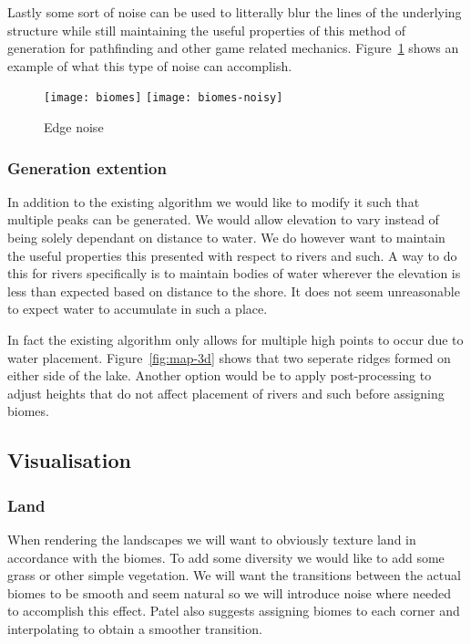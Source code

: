 Lastly some sort of noise can be used to litterally blur the lines of the underlying structure while still maintaining the useful properties of this method of generation for pathfinding and other game related mechanics. Figure~\ref{fig:biomes} shows an example of what this type of noise can accomplish.

\newlength{\imagewidth}

\begin{figure}[H]
	\centering
	\texttt{[image: biomes]}
	\texttt{[image: biomes-noisy]}
	\caption{Edge noise}
	\label{fig:biomes}
\end{figure}

\subsubsection{Generation extention}

In addition to the existing algorithm we would like to modify it such that multiple peaks can be generated. We would allow elevation to vary instead of being solely dependant on distance to water. We do however want to maintain the useful properties this presented with respect to rivers and such. A way to do this for rivers specifically is to maintain bodies of water wherever the elevation is less than expected based on distance to the shore. It does not seem unreasonable to expect water to accumulate in such a place. 

In fact the existing algorithm only allows for multiple high points to occur due to water placement. Figure~\ref{fig:map-3d} shows that two seperate ridges formed on either side of the lake. Another option would be to apply post-processing to adjust heights that do not affect placement of rivers and such before assigning biomes.

\subsection{Visualisation}

\subsubsection{Land}

When rendering the landscapes we will want to obviously texture land in accordance with the biomes. To add some diversity we would like to add some grass or other simple vegetation. We will want the transitions between the actual biomes to be smooth and seem natural so we will introduce noise where needed to accomplish this effect. Patel\cite{redblob} also suggests assigning biomes to each corner and interpolating to obtain a smoother transition.

